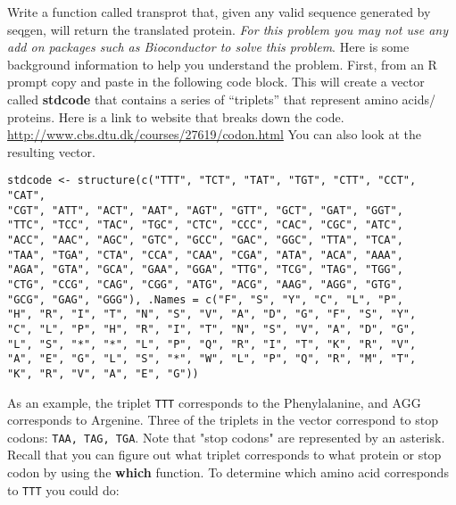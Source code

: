 \documentclass{article}
\begin{document}
Write a function called transprot that, given any valid sequence generated by seqgen, will return the translated protein. \emph{For this problem you may not use any add on packages such as Bioconductor to solve this problem}. Here is some background information to help you understand the problem. First, from an R prompt copy and paste in the following code block. This will create a vector called \textbf{stdcode} that contains a series of ``triplets'' that represent amino acids/ proteins. Here is a link to website that breaks down the code. \url{http://www.cbs.dtu.dk/courses/27619/codon.html} You can also look at the resulting vector.
\newline
\begin{verbatim}
stdcode <- structure(c("TTT", "TCT", "TAT", "TGT", "CTT", "CCT", "CAT", 
"CGT", "ATT", "ACT", "AAT", "AGT", "GTT", "GCT", "GAT", "GGT", 
"TTC", "TCC", "TAC", "TGC", "CTC", "CCC", "CAC", "CGC", "ATC", 
"ACC", "AAC", "AGC", "GTC", "GCC", "GAC", "GGC", "TTA", "TCA", 
"TAA", "TGA", "CTA", "CCA", "CAA", "CGA", "ATA", "ACA", "AAA", 
"AGA", "GTA", "GCA", "GAA", "GGA", "TTG", "TCG", "TAG", "TGG", 
"CTG", "CCG", "CAG", "CGG", "ATG", "ACG", "AAG", "AGG", "GTG", 
"GCG", "GAG", "GGG"), .Names = c("F", "S", "Y", "C", "L", "P", 
"H", "R", "I", "T", "N", "S", "V", "A", "D", "G", "F", "S", "Y", 
"C", "L", "P", "H", "R", "I", "T", "N", "S", "V", "A", "D", "G", 
"L", "S", "*", "*", "L", "P", "Q", "R", "I", "T", "K", "R", "V", 
"A", "E", "G", "L", "S", "*", "W", "L", "P", "Q", "R", "M", "T", 
"K", "R", "V", "A", "E", "G"))
\end{verbatim}
As an example, the triplet \texttt{TTT} corresponds to the Phenylalanine, and AGG corresponds to Argenine. Three of the triplets in the vector correspond to stop codons: \texttt{TAA, TAG, TGA}. Note that "stop codons" are represented by an asterisk. Recall that you can figure out what triplet corresponds to what protein or stop codon by using the \textbf{which} function. To determine which amino acid corresponds to \texttt{TTT} you could do:
\end{document}
